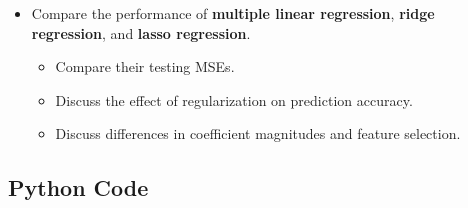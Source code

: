 \documentclass[11pt]{article}
\begin{document}
\begin{itemize}
	\item Compare the performance of \textbf{multiple linear regression}, \textbf{ridge regression}, and \textbf{lasso regression}.
	\begin{itemize}
		\item Compare their testing MSEs.
		\item Discuss the effect of regularization on prediction accuracy.
		\item Discuss differences in coefficient magnitudes and feature selection.
	\end{itemize}
	
\end{itemize}

\subsection*{Python Code}
\end{document}
